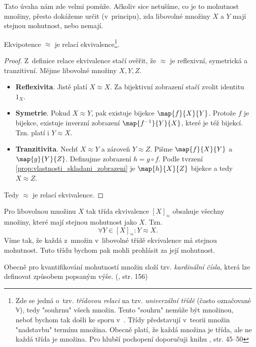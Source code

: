 Tato úvaha nám zde velmi pomůže. Ačkoliv sice netušíme, co je to mohutnost množiny, přesto dokážeme určit (v~principu), zda libovolné množiny $X$ a $Y$ mají stejnou mohutnost, nebo nemají.
\begin{lemma}
    Ekvipotence $\approx$ je relací ekvivalence\footnote{Zde se jedná o~tzv. \emph{třídovou relaci} na tzv. \emph{univerzální třídě} (často označované $\mathbb{V}$), tedy "souhrnu" všech množin. Tento "souhrn" nemůže být množinou, neboť bychom tak došli ke sporu v~\ZF{}. Třídy představují v~teorii množin "nadstavbu" termínu množina. Obecně platí, že každá množina je třída, ale ne každá třída je množina. Pro hlubší pochopení doporučuji knihu \cite{BalcarStepanek1986}, str. 45--50}.
\end{lemma}
\begin{proof}
    Z~definice relace ekvivalence stačí ověřit, že $\approx$ je reflexivní, symetrická a tranzitivní. Mějme libovolné množiny $X,Y,Z$.
    \begin{itemize}
        \item \textbf{Reflexivita}. Jistě platí $X\approx X$. Za bijektivní zobrazení stačí zvolit identitu $1_X$.
        \item \textbf{Symetrie}. Pokud $X\approx Y$, pak existuje bijekce $\map{f}{X}{Y}$. Protože $f$ je bijekce, existuje inverzní zobrazení $\map{f^{-1}}{Y}{X}$, které je též bijekcí. Tzn. platí i $Y\approx X$.
        \item \textbf{Tranzitivita}. Nechť $X\approx Y$ a zároveň $Y\approx Z$. Pišme $\map{f}{X}{Y}$ a $\map{g}{Y}{Z}$. Definujme zobrazení $h=g\circ f$. Podle tvrzení \ref{prop:vlastnosti_skladani_zobrazeni} je $\map{h}{X}{Z}$ bijekce a tedy $X\approx Z$.
    \end{itemize}
    Tedy $\approx$ je relací ekvivalence.
\end{proof}
Pro libovolnou množinu $X$ tak třída ekvivalence $[X]_\approx$ obsahuje všechny množiny, které mají stejnou mohutnost jako $X$. Tzn.
\begin{equation*}
    \forall Y\in [X]_\approx: Y\approx X.
\end{equation*}
Víme tak, že každá z~množin v~libovolné třídě ekvivalence má stejnou mohutnost. Tuto třídu bychom pak mohli prohlásit za její mohutnost.\par
Obecně pro kvantifikování mohutností množin složí tzv. \emph{kardinální čísla}, která lze definovat způsobem popsaným výše. (\cite{Potter2009}, str. 156) 
